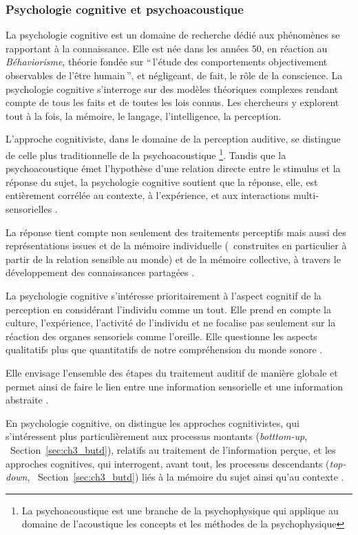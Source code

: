 \subsubsection{Psychologie cognitive et psychoacoustique}

La psychologie cognitive est un domaine de recherche dédié aux phénomènes se rapportant à la connaissance. Elle est née dans les années 50, en réaction au \emph{Béhaviorisme}, théorie fondée sur ``\,l'étude des comportements objectivement observables de l'être humain\,'', et négligeant, de fait, le rôle de la conscience. La psychologie cognitive s'interroge sur des modèles théoriques complexes rendant compte de tous les faits et de toutes les lois connus. Les chercheurs y explorent tout à la fois, la mémoire, le langage, l'intelligence, la perception.
 
L'approche cognitiviste, dans le domaine de la perception auditive, se distingue de celle plus traditionnelle de la psychoacoustique \footnote{La psychoacoustique est une branche de la psychophysique qui applique au domaine de l'acoustique les concepts et les méthodes de la psychophysique}. Tandis que la psychoacoustique émet l'hypothèse d'une relation directe entre le stimulus et la réponse du sujet, la psychologie cognitive soutient que la réponse, elle, est entièrement corrélée au contexte, à l'expérience, et aux interactions multi-sensorielles \citep{maffiolo_marieParis_1997}.

La réponse tient compte non seulement des traitements perceptifs mais aussi des représentations issues et de la mémoire individuelle (\ie~construites en particulier à partir de la relation sensible au monde) et de la mémoire collective, à travers le développement des connaissances partagées \citep[p. ??]{maffiolo_caracterisation_1999}.

La psychologie cognitive s'intéresse prioritairement à l'aspect cognitif de la perception en considérant l'individu comme un tout. Elle prend en compte la culture, l'expérience, l'activité de l'individu et ne focalise pas seulement sur la réaction des organes sensoriels comme l'oreille. Elle questionne les aspects qualitatifs plus que quantitatifs de notre compréhension du monde sonore \citep[p. ??]{maffiolo_caracterisation_1999}.

Elle envisage l'ensemble des étapes du traitement auditif de manière globale et permet ainsi de faire le lien entre une information sensorielle et une information abstraite \citep{mcadams1994penser}.

En psychologie cognitive, on distingue les approches cognitivistes, qui s'intéressent plus particulièrement aux processus montants (\emph{botttom-up}, \cf~Section~\ref{sec:ch3_butd}), relatifs au traitement de l'information perçue, et les approches cognitives, qui interrogent, avant tout, les processus descendants (\emph{top-down}, \cf~Section~\ref{sec:ch3_butd}) liés à la mémoire du sujet ainsi qu'au contexte \citep[p. ??]{guastavino_etude_2003}.

